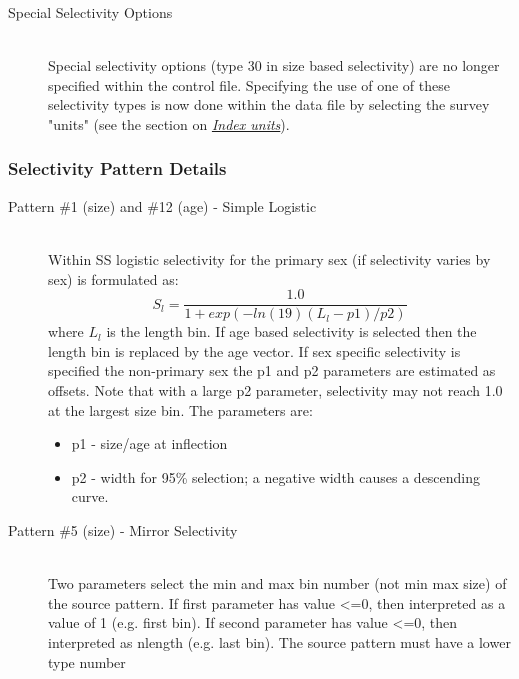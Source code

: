 \begin{description}
	\item[Special Selectivity Options]\hfil\\
	Special selectivity options (type 30 in size based selectivity) are no longer specified within the control file. Specifying the use of one of these selectivity types is now done within the data file by selecting the survey "units" (see the section on \hyperlink{IndexUnits}{\textit{Index units}}).	
\end{description}

\subsubsection{Selectivity Pattern Details}
\begin{description}
	\item[Pattern \#1 (size) and \#12 (age) - Simple Logistic]\hfill\\
	Within SS logistic selectivity for the primary sex (if selectivity varies by sex) is formulated as:
	\begin{equation}
	S_l = \frac{1.0}{1+exp(-ln(19)(L_l - p1)/p2)}
	\end{equation}
	where $L_l$ is the length bin.  If age based selectivity is selected then the length bin is replaced by the age vector. If sex specific selectivity is specified the non-primary sex the p1 and p2 parameters are estimated as offsets.  Note that with a large p2 parameter, selectivity may not reach 1.0 at the largest size bin. The parameters are:
		\begin{itemize}
			\item p1 - size/age at inflection
			\item p2 - width for 95\% selection; a negative width causes a descending curve.
		\end{itemize}
\end{description}


\begin{description}
	\item[Pattern \#5 (size) - Mirror Selectivity]\hfil\\
	Two parameters select the min and max bin number (not min max size) of the source pattern.  If first parameter has value <=0, then interpreted as a value of 1 (e.g. first bin).  If second parameter has value <=0, then interpreted as nlength (e.g. last bin). The source pattern must have a lower type number
\end{description}	


